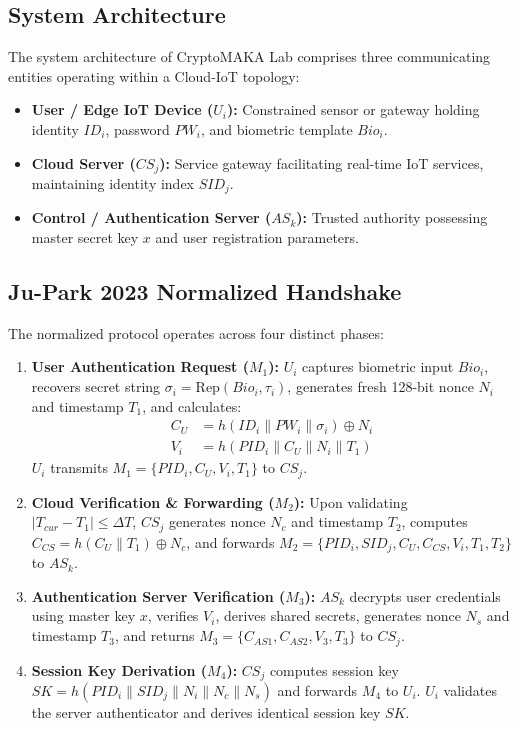 \documentclass[journal,10pt,twocolumn]{IEEEtran}
\begin{document}
\subsection{System Architecture}
The system architecture of CryptoMAKA Lab comprises three communicating entities operating within a Cloud-IoT topology:
\begin{itemize}
    \item \textbf{User / Edge IoT Device ($U_i$):} Constrained sensor or gateway holding identity $ID_i$, password $PW_i$, and biometric template $Bio_i$.
    \item \textbf{Cloud Server ($CS_j$):} Service gateway facilitating real-time IoT services, maintaining identity index $SID_j$.
    \item \textbf{Control / Authentication Server ($AS_k$):} Trusted authority possessing master secret key $x$ and user registration parameters.
\end{itemize}

\subsection{Ju-Park 2023 Normalized Handshake}
The normalized protocol operates across four distinct phases:
\begin{enumerate}
    \item \textbf{User Authentication Request ($M_1$):} $U_i$ captures biometric input $Bio_i$, recovers secret string $\sigma_i = \text{Rep}(Bio_i, \tau_i)$, generates fresh 128-bit nonce $N_i$ and timestamp $T_1$, and calculates:
    \begin{align}
        C_U &= h(ID_i \parallel PW_i \parallel \sigma_i) \oplus N_i \\
        V_i &= h(PID_i \parallel C_U \parallel N_i \parallel T_1)
    \end{align}
    $U_i$ transmits $M_1 = \{ PID_i, C_U, V_i, T_1 \}$ to $CS_j$.
    \item \textbf{Cloud Verification \& Forwarding ($M_2$):} Upon validating $|T_{cur} - T_1| \le \Delta T$, $CS_j$ generates nonce $N_c$ and timestamp $T_2$, computes $C_{CS} = h(C_U \parallel T_1) \oplus N_c$, and forwards $M_2 = \{ PID_i, SID_j, C_U, C_{CS}, V_i, T_1, T_2 \}$ to $AS_k$.
    \item \textbf{Authentication Server Verification ($M_3$):} $AS_k$ decrypts user credentials using master key $x$, verifies $V_i$, derives shared secrets, generates nonce $N_s$ and timestamp $T_3$, and returns $M_3 = \{ C_{AS1}, C_{AS2}, V_3, T_3 \}$ to $CS_j$.
    \item \textbf{Session Key Derivation ($M_4$):} $CS_j$ computes session key $SK = h(PID_i \parallel SID_j \parallel N_i \parallel N_c \parallel N_s)$ and forwards $M_4$ to $U_i$. $U_i$ validates the server authenticator and derives identical session key $SK$.
\end{enumerate}
\end{document}
